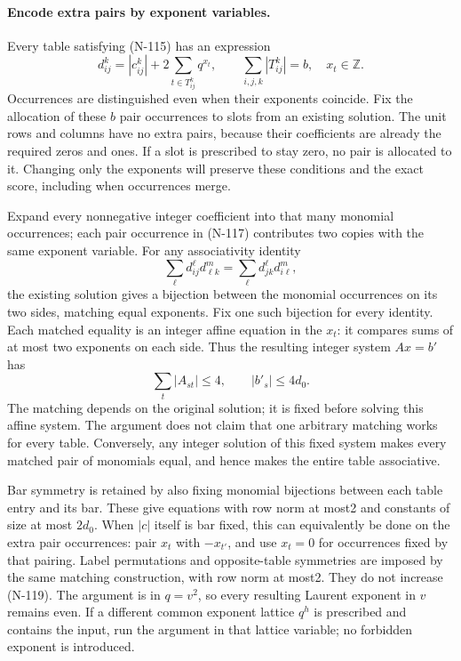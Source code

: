 \paragraph{Encode extra pairs by exponent variables.}
Every table satisfying (N-115) has an expression
\[
 d_{ij}^k=|c_{ij}^k|+
                2\sum_{t\in T_{ij}^k}q^{x_t},
 \qquad \sum_{i,j,k}|T_{ij}^k|=b,
 \quad x_t\in\mathbb Z.
 \tag{N-117}
\]
Occurrences are distinguished even when their exponents coincide.
Fix the allocation of these $b$ pair occurrences to slots from
an existing solution.  The unit rows and columns have no extra
pairs, because their coefficients are already the required zeros
and ones.  If a slot is prescribed to stay zero, no pair is
allocated to it.  Changing only the exponents will preserve these
conditions and the exact score, including when occurrences merge.

Expand every nonnegative integer coefficient into that many
monomial occurrences; each pair occurrence in (N-117) contributes
two copies with the same exponent variable.  For any associativity
identity
\[
 \sum_\ell d_{ij}^{\ell}d_{\ell k}^{m}
       =\sum_\ell d_{jk}^{\ell}d_{i\ell}^{m},
 \tag{N-118}
\]
the existing solution gives a bijection between the monomial
occurrences on its two sides, matching equal exponents.  Fix one
such bijection for every identity.  Each matched equality is an
integer affine equation in the $x_t$: it compares sums of at most
two exponents on each side.  Thus the resulting integer system
$Ax=b'$ has
\[
       \sum_t|A_{st}|\le4,
                  \qquad |b'_s|\le4d_0.
 \tag{N-119}
\]
The matching depends on the original solution; it is fixed before
solving this affine system.  The argument does not claim that one
arbitrary matching works for every table.  Conversely, any integer
solution of this fixed system makes every matched pair of monomials
equal, and hence makes the entire table associative.

Bar symmetry is retained by also fixing monomial bijections
between each table entry and its bar.  These give equations with
row norm at most2 and constants of size at most $2d_0$.
When $|c|$ itself is bar fixed, this can equivalently be done on
the extra pair occurrences: pair $x_t$ with $-x_{t'}$, and use
$x_t=0$ for occurrences fixed by that pairing.  Label permutations
and opposite-table symmetries are imposed by the same matching
construction, with row norm at most2.  They do not increase (N-119).
The argument is in $q=v^2$, so every resulting Laurent exponent
in $v$ remains even.  If a different common exponent lattice
$q^h$ is prescribed and contains the input, run the argument in
that lattice variable; no forbidden exponent is introduced.

